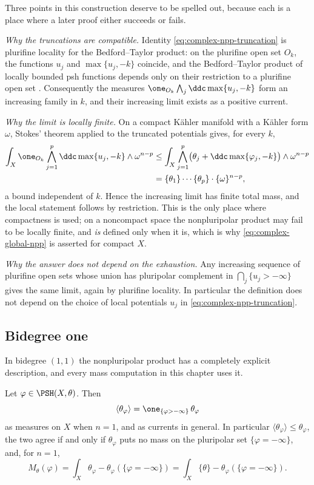 Three points in this construction deserve to be spelled out, because each
is a place where a later proof either succeeds or fails.

\emph{Why the truncations are compatible.}  Identity
\eqref{eq:complex-npp-truncation} is plurifine locality for the
Bedford--Taylor product: on the plurifine open set \(O_k\), the functions
\(u_j\) and \(\max\{u_j,-k\}\) coincide, and the Bedford--Taylor product
of locally bounded psh functions depends only on their restriction to a
plurifine open set \cite{BT87}.  Consequently the measures
\(\one_{O_k}\bigwedge_j\ddc\max\{u_j,-k\}\) form an increasing family in
\(k\), and their increasing limit exists as a positive current.

\emph{Why the limit is locally finite.}  On a compact K\"ahler manifold
with a K\"ahler form \(\omega\), Stokes' theorem applied to the truncated
potentials gives, for every \(k\),
\[
 \begin{aligned}
 \int_X\one_{O_k}\bigwedge_{j=1}^p\ddc\max\{u_j,-k\}\wedge\omega^{n-p}
 &\leq
 \int_X\bigwedge_{j=1}^p
     \bigl(\theta_j+\ddc\max\{\varphi_j,-k\}\bigr)\wedge\omega^{n-p}\\
 &=\{\theta_1\}\cdots\{\theta_p\}\cdot\{\omega\}^{n-p},
 \end{aligned}
\]
a bound independent of \(k\).  Hence the increasing limit has finite
total mass, and the local statement follows by restriction.  This is the
only place where compactness is used; on a noncompact space the
nonpluripolar product may fail to be locally finite, and \emph{is} defined
only when it is, which is why \eqref{eq:complex-global-npp} is asserted
for compact \(X\).

\emph{Why the answer does not depend on the exhaustion.}  Any increasing
sequence of plurifine open sets whose union has pluripolar complement in
\(\bigcap_j\{u_j>-\infty\}\) gives the same limit, again by plurifine
locality.  In particular the definition does not depend on the choice of
local potentials \(u_j\) in \eqref{eq:complex-npp-truncation}.

\subsection{Bidegree one}
\label{sec:ch51-npp-bidegree-one}

In bidegree \((1,1)\) the nonpluripolar product has a completely explicit
description, and every mass computation in this chapter uses it.

\begin{lemma}\label{lem:ch51-npp-bidegree-one}
Let \(\varphi\in\PSH(X,\theta)\).  Then
\[
 \langle\theta_\varphi\rangle
 =\one_{\{\varphi>-\infty\}}\,\theta_\varphi
\]
as measures on \(X\) when \(n=1\), and as currents in general.  In
particular \(\langle\theta_\varphi\rangle\leq\theta_\varphi\), the two
agree if and only if \(\theta_\varphi\) puts no mass on the pluripolar
set \(\{\varphi=-\infty\}\), and, for \(n=1\),
\[
 M_\theta(\varphi)
 =\int_X\theta_\varphi-\theta_\varphi(\{\varphi=-\infty\})
 =\int_X\{\theta\}-\theta_\varphi(\{\varphi=-\infty\}).
\]
\end{lemma}

